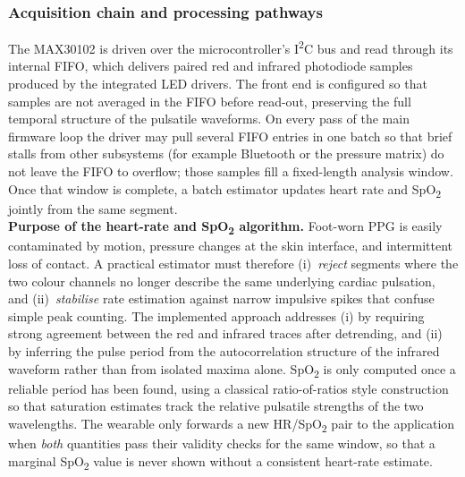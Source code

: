 \subsubsection{Acquisition chain and processing pathways}

\noindent The MAX30102 is driven over the microcontroller's I\textsuperscript{2}C bus and read through
its internal FIFO, which delivers paired red and infrared photodiode samples produced by the
integrated LED drivers. The front end is configured so that samples are not averaged in the FIFO
before read-out, preserving the full temporal structure of the pulsatile waveforms. On every pass of
the main firmware loop the driver may pull several FIFO entries in one batch so that brief stalls
from other subsystems (for example Bluetooth or the pressure matrix) do not leave the FIFO to
overflow; those samples fill a fixed-length analysis window. Once that window is complete, a batch
estimator updates heart rate and SpO\textsubscript{2} jointly from the same segment. \\

\noindent \textbf{Purpose of the heart-rate and SpO\textsubscript{2} algorithm.} Foot-worn PPG is
easily contaminated by motion, pressure changes at the skin interface, and intermittent loss of
contact. A practical estimator must therefore (i)~\emph{reject} segments where the two colour
channels no longer describe the same underlying cardiac pulsation, and (ii)~\emph{stabilise} rate
estimation against narrow impulsive spikes that confuse simple peak counting. The implemented
approach addresses (i) by requiring strong agreement between the red and infrared traces after
detrending, and (ii) by inferring the pulse period from the autocorrelation structure of the infrared
waveform rather than from isolated maxima alone. SpO\textsubscript{2} is only computed once a
reliable period has been found, using a classical ratio-of-ratios style construction so that
saturation estimates track the relative pulsatile strengths of the two wavelengths. The wearable
only forwards a new HR/SpO\textsubscript{2} pair to the application when \emph{both} quantities pass
their validity checks for the same window, so that a marginal SpO\textsubscript{2} value is never
shown without a consistent heart-rate estimate. \\


